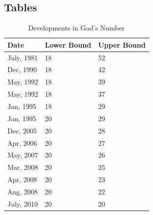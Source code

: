 \documentclass{report}
\newcommand{\tbo}[1]{\textbf{#1}}
\begin{document}
    \newpage
    \begin{appendices}
		\chapter{Tables}
	   	\begin{table}[H]
			\def\arraystretch{1.25}
			\centering
			\caption{Developments in God's Number}
			\label{tab:godsNumber}
			\begin{tabular}{M{0.16\textwidth}M{0.16\textwidth}M{0.16\textwidth}}
				\toprule
				\tbo{Date} & \tbo{Lower Bound} & \tbo{Upper Bound} \\
				\midrule
				July, 1981	&	18	&	52 \\
				Dec, 1990	&	18	&	42 \\
				May, 1992	&	18	&	39 \\
				May, 1992	&	18	&	37 \\
				Jan, 1995	&	18	&	29 \\
				Jan, 1995	&	20	&	29 \\
				Dec, 2005	&	20	&	28 \\
				Apr, 2006	&	20	&	27 \\
				May, 2007	&	20	&	26 \\
				Mar, 2008	&	20	&	25 \\
				Apr, 2008	&	20	&	23 \\
				Aug, 2008	&	20	&	22 \\
				July, 2010	&	20	&	20 \\
				\bottomrule
			\end{tabular}
		\end{table}
				

\end{appendices}
\end{document}
